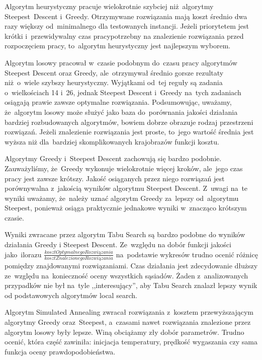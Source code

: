 \documentclass[a4paper,10pt]{article}
\begin{document}
Algorytm heurystyczny pracuje wielokrotnie szybciej niż~algorytmy Steepest~Descent i~Greedy.
Otrzymywane rozwiązania mają koszt średnio dwa razy większy od~minimalnego dla testowanych instancji.
Jeżeli priorytetem jest krótki i~przewidywalny czas pracypotrzebny na znalezienie rozwiązania przed rozpoczęciem pracy, to~algorytm heurystyczny jest najlepszym wyborem.

Algorytm losowy pracował w~czasie podobnym do~czasu pracy algorytmów Steepest Descent oraz Greedy, ale~otrzymywał średnio gorsze
rezultaty niż~o~wiele szybszy heurystyczny.
Wyjątkami od~tej reguły są zadania o~wielkościach 14 i~26, jednak Steepest Descent i~Greedy na~tych zadaniach osiągają prawie zawsze optymalne rozwiązania.
Podsumowując, uważamy, że~algorytm losowy może służyć jako baza do~porównania jakości działania bardziej rozbudowanych algorytmów,
bowiem dobrze obrazuje rodzaj przestrzeni rozwiązań.
Jeżeli znalezienie rozwiązania jest proste, to~jego wartość średnia jest wyższa niż dla~bardziej skomplikowanych krajobrazów funkcji
kosztu.

Algorytmy Greedy i~Steepest Descent zachowują się bardzo podobnie.
Zauważyliśmy, że~Greedy wykonuje wielokrotnie więcej kroków, ale~jego czas pracy jest zawsze krótszy.
Jakość osiąganych przez niego rozwiązań jest porównywalna z~jakością wyników algorytmu Steepest Descent.
Z~uwagi na~te wyniki uważamy, że~należy uznać algorytm Greedy za~lepszy od~algorytmu Steepest, ponieważ osiąga praktycznie jednakowe
wyniki w~znacząco krótszym czasie.

Wyniki zwracane przez algorytm Tabu Search są bardzo podobne do wyników działania Greedy i Steepest Descent.
Ze~względu na dobór funkcji jakości jako~ilorazu $\frac{koszt Optymalnego Rozwiązania}{koszt Znalezionego Rozwiązania}$ na~podstawie wykresów trudno ocenić różnicę pomiędzy znajdowanymi rozwiązaniami.
Czas działania jest zdecydowanie dłuższy ze~względu na~konieczność oceny wszystkich sąsiadów.
Żaden z~analizowanych przypadków nie był na~tyle ,,interesujący'', aby Tabu Search znalazł lepszy wynik od podstawowych algorytmów local search.

Algorytm Simulated Annealing zwracał rozwiązania z~kosztem przewyższającym algorytmy Greedy oraz~Steepest, a~czasami nawet rozwiązania znalezione przez algorytm losowy były lepsze.
Winą obciążamy zły dobór parametrów.
Trudno ocenić, która część zawiniła: inicjacja temperatury, prędkość wygaszania czy sama funkcja oceny prawdopodobieństwa.
\end{document}
